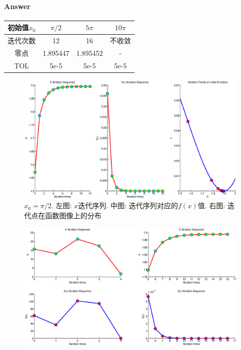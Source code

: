 \documentclass{article}
\begin{document}
\begin{CJK*}{UTF8}{song}
			\paragraph{Answer}
				\begin{center}
					\begin{tabular}{|c|c|c|c|}
						\hline
						初始值$x_0$ & $\pi /2$ & $5\pi$ & $10\pi$ \\
						\hline
						迭代次数 & 12 &16 & 不收敛\\
						\hline
						零点 & 1.895447& 1.895452& -\\
						\hline
						TOL &5e-5 &5e-5 &5e-5 \\
						\hline
					\end{tabular}
				\end{center}
				\begin{figure}[H]
					\centering
					\includegraphics[width=1.0\textwidth]{../chapter2_3_2.eps}
					\caption{$x_0 = \pi /2$. 左图: $x$迭代序列. 中图: 迭代序列对应的$f\left(x\right)$值. 右图: 迭代点在函数图像上的分布}
					\label{img_chapter2_3_2}
				\end{figure}
				\begin{figure}[H]
					\centering
					\includegraphics[width=1.0\textwidth]{../chapter2_3_3.eps}

\end{figure}
\end{CJK*}
\end{document}
